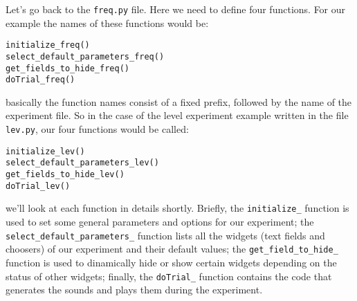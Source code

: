 Let's go back to the \verb+freq.py+ file. Here we need to define four functions. For our example the names of these functions would be:
\begin{lstlisting}[stepnumber=0]
initialize_freq()
select_default_parameters_freq()
get_fields_to_hide_freq()
doTrial_freq()
\end{lstlisting}
basically the function names consist of a fixed prefix, followed by the name of the experiment file. So in the case of the level experiment example written in the file \verb+lev.py+, our four functions would be called:
\begin{lstlisting}[stepnumber=0]
initialize_lev()
select_default_parameters_lev()
get_fields_to_hide_lev()
doTrial_lev()
\end{lstlisting}
we'll look at each function in details shortly. Briefly, the \verb+initialize_+ function is used to set some general parameters and options for our experiment; the \verb+select_default_parameters_+ function lists all the widgets (text fields and choosers) of our experiment and their default values; the \verb+get_field_to_hide_+ function is used to dinamically hide or show certain widgets depending on the status of other widgets; finally, the \verb+doTrial_+ function contains the code that generates the sounds and plays them during the experiment.

